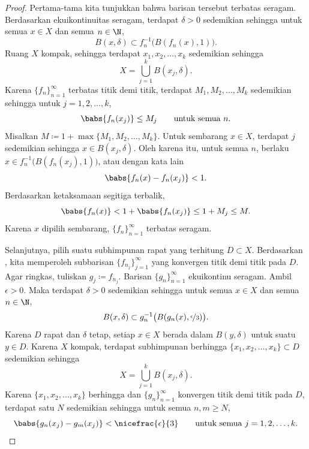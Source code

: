 \begin{proof}
Pertama-tama kita tunjukkan bahwa barisan tersebut terbatas seragam.
Berdasarkan ekuikontinuitas seragam,
terdapat $\delta > 0$
sedemikian sehingga
untuk semua $x \in X$ dan semua $n \in \N$,
\begin{equation*}
B(x,\delta) \subset f_n^{-1}\bigl(B(f_n(x),1)\bigr) .
\end{equation*}
Ruang $X$ kompak, sehingga terdapat $x_1,x_2,\ldots,x_k$
sedemikian sehingga
\begin{equation*}
X = \bigcup_{j=1}^k B(x_j,\delta) .
\end{equation*}
Karena $\{ f_n \}_{n=1}^\infty$ terbatas titik demi titik, terdapat $M_1,M_2,\ldots,M_k$
sedemikian sehingga untuk $j=1,2,\ldots,k$,
\begin{equation*}
\babs{f_n(x_j)} \leq M_j \qquad \text{untuk semua } n.
\end{equation*}
Misalkan $M \coloneqq 1+ \max \{ M_1,M_2,\ldots,M_k \}$.  Untuk sembarang
$x \in X$, terdapat $j$ sedemikian sehingga $x \in B(x_j,\delta)$.  Oleh karena itu,
untuk semua $n$, berlaku
$x \in f_n^{-1}\bigl(B(f_n(x_j),1)\bigr)$, atau dengan kata lain
\begin{equation*}
\babs{f_n(x)-f_n(x_j)} < 1 .
\end{equation*}
Berdasarkan ketaksamaan segitiga terbalik,
\begin{equation*}
\babs{f_n(x)} < 1+ \babs{f_n(x_j)} \leq 1+M_j \leq M .
\end{equation*}
Karena $x$ dipilih sembarang, $\{f_n\}_{n=1}^\infty$ terbatas seragam.


Selanjutnya, pilih suatu subhimpunan rapat yang terhitung $D \subset X$.
Berdasarkan , kita memperoleh
subbarisan $\{ f_{n_j} \}_{j=1}^\infty$ yang konvergen titik demi titik pada $D$.
Agar ringkas, tuliskan $g_j \coloneqq f_{n_j}$.
Barisan $\{ g_n \}_{n=1}^\infty$
ekuikontinu seragam.
Ambil $\epsilon > 0$.  Maka terdapat $\delta > 0$
sedemikian sehingga untuk semua $x \in X$ dan semua $n \in \N$,
\begin{equation*}
B(x,\delta) \subset g_n^{-1}\bigl(B(g_n(x),\nicefrac{\epsilon}{3})\bigr).
\end{equation*}
Karena $D$ rapat dan $\delta$ tetap, setiap $x \in X$ berada dalam $B(y,\delta)$
untuk suatu $y \in D$.  Karena $X$ kompak,
terdapat subhimpunan berhingga $\{ x_1,x_2,\ldots,x_k \} \subset D$
sedemikian sehingga
\begin{equation*}
X = \bigcup_{j=1}^k B(x_j,\delta) .
\end{equation*}
Karena $\{ x_1,x_2,\ldots,x_k \}$
berhingga dan $\{ g_n \}_{n=1}^\infty$
konvergen titik demi titik pada $D$, terdapat satu $N$ sedemikian sehingga untuk
semua $n,m \geq N$,
\begin{equation*}
\babs{g_n(x_j)-g_m(x_j)} < \nicefrac{\epsilon}{3}
 \qquad \text{untuk semua } j=1,2,\ldots,k.
\end{equation*}


\end{proof}
